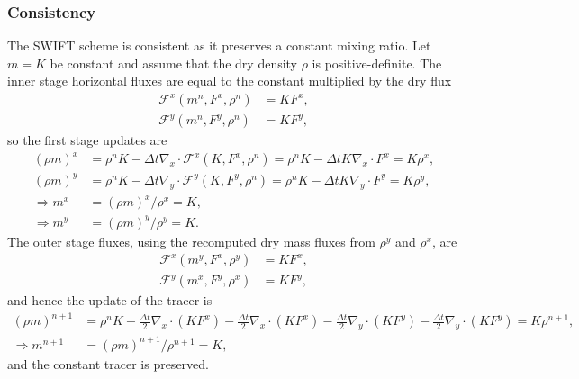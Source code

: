 \documentclass[11pt,a4paper]{article}
\begin{document}
\subsubsection{Consistency}

The SWIFT scheme is consistent as it preserves a constant mixing ratio. Let $m=K$ be constant and assume that the dry density $\rho$ is positive-definite. The inner stage horizontal fluxes are equal to the constant multiplied by the dry flux
\begin{subequations}
\begin{align}   
   \mathcal{F}^x(m^n,F^{x},\rho^n) &= K F^x, \\
   \mathcal{F}^y(m^n,F^{y},\rho^n) &= K F^y,
\end{align}
\end{subequations}
so the first stage updates are
\begin{subequations}
\begin{align}        
    (\rho m)^x &=\rho^n K - \Delta{t} \nabla_x\cdot \mathcal{F}^x(K,F^{x},\rho^n) = \rho^n K - \Delta{t} K \nabla_x\cdot F^x = K \rho^x, \\
    (\rho m)^y &=\rho^n K - \Delta{t} \nabla_y\cdot \mathcal{F}^y(K,F^{y},\rho^n) = \rho^n K - \Delta{t} K \nabla_y\cdot F^y = K \rho^y, \\
    \Rightarrow m^x &= (\rho m)^x / \rho^x = K, \\
    \Rightarrow m^y &= (\rho m)^y / \rho^y = K.
\end{align}
\end{subequations}
The outer stage fluxes, using the recomputed dry mass fluxes from $\rho^y$ and $\rho^x$, are
\begin{subequations}
\begin{align}
    \mathcal{F}^x(m^y,F^{x},\rho^y) & = K F^x, \\
    \mathcal{F}^y(m^x,F^{y},\rho^x) & = K F^y,
\end{align}
\end{subequations}
 and hence the update of the tracer is
 \begin{subequations}
\begin{align}
    (\rho m)^{n+1} &= \rho^n K -\frac{\Delta{t}}{2}\nabla_x\cdot (K F^x) -\frac{\Delta{t}}{2}\nabla_x\cdot (K F^x) -\frac{\Delta{t}}{2}\nabla_y\cdot (K F^y) -\frac{\Delta{t}}{2}\nabla_y\cdot (K F^y) = K \rho^{n+1}, \\
    \Rightarrow m^{n+1} &=  (\rho m)^{n+1}/ \rho^{n+1} = K,
\end{align}
\end{subequations}
and the constant tracer is preserved.
\end{document}
